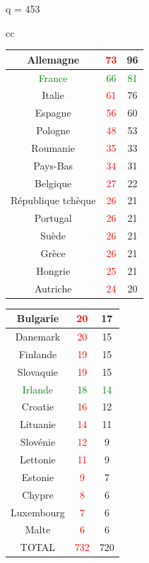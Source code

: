\documentclass[11pt]{beamer}
\begin{document}
	\begin{frame}
		\begin{center}
			q = 453
		\end{center}
		\begin{tabular}{cc}
			\begin{tabular}{|c|c|c|}
				\hline Allemagne & \textcolor{red}{73} & 96 \\
				\hline \textcolor{green}{France} & \textcolor{green}{66} & \textcolor{green}{81} \\
				\hline Italie & \textcolor{red}{61} & 76 \\
				\hline Espagne & \textcolor{red}{56} & 60 \\
				\hline Pologne & \textcolor{red}{48} & 53 \\
				\hline Roumanie & \textcolor{red}{35} & 33 \\
				\hline Pays-Bas & \textcolor{red}{34} & 31 \\
				\hline Belgique & \textcolor{red}{27} & 22 \\
				\hline République tchèque & \textcolor{red}{26} & 21 \\
				\hline Portugal & \textcolor{red}{26} & 21 \\
				\hline Suède & \textcolor{red}{26} & 21 \\
				\hline Grèce & \textcolor{red}{26} & 21 \\
				\hline Hongrie & \textcolor{red}{25} & 21 \\
				\hline Autriche & \textcolor{red}{24} & 20 \\
				\hline
			\end{tabular}
			\begin{tabular}{|c|c|c|}
				\hline Bulgarie & \textcolor{red}{20} & 17 \\
				\hline Danemark & \textcolor{red}{20} & 15 \\
				\hline Finlande & \textcolor{red}{19} & 15 \\
				\hline Slovaquie & \textcolor{red}{19} & 15 \\
				\hline \textcolor{green}{Irlande} & \textcolor{green}{18} & \textcolor{green}{14} \\
				\hline Croatie & \textcolor{red}{16} & 12 \\
				\hline Lituanie & \textcolor{red}{14} & 11 \\
				\hline Slovénie & \textcolor{red}{12} & 9 \\
				\hline Lettonie & \textcolor{red}{11} & 9 \\
				\hline Estonie & \textcolor{red}{9} & 7 \\
				\hline Chypre & \textcolor{red}{8} & 6 \\
				\hline Luxembourg & \textcolor{red}{7} & 6 \\
				\hline Malte & \textcolor{red}{6} & 6 \\
				\hline TOTAL & \textcolor{red}{732} & 720 \\
				\hline
			\end{tabular}
		\end{tabular}
	\end{frame}
	
\end{document}
